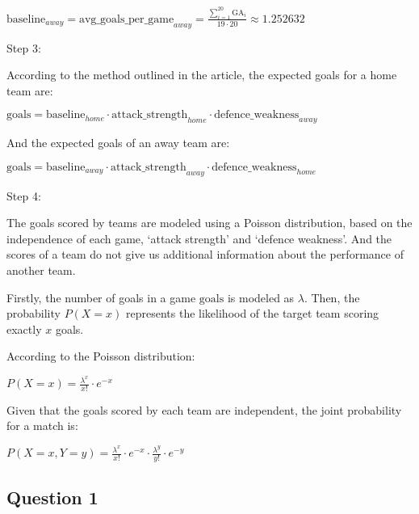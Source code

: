 \documentclass[
]{article}
\begin{document}
\(\text{baseline}_{away}=\text{avg\_goals\_per\_game}_{away}=\frac{\sum_{i=1}^{20}\text{GA}_i}{19\cdot20}\approx1.252632\)

Step 3:

According to the method outlined in the article, the expected goals for
a home team are:

\(\text{goals}=\text{baseline}_{home}\cdot\text{attack\_strength}_{home}\cdot\text{defence\_weakness}_{away}\)

And the expected goals of an away team are:

\(\text{goals}=\text{baseline}_{away}\cdot\text{attack\_strength}_{away}\cdot\text{defence\_weakness}_{home}\)

Step 4:

The goals scored by teams are modeled using a Poisson distribution,
based on the independence of each game, `attack strength' and `defence
weakness'. And the scores of a team do not give us additional
information about the performance of another team.

Firstly, the number of goals in a game \(\text{goals}\) is modeled as
\(\lambda\). Then, the probability \(P(X = x)\) represents the
likelihood of the target team scoring exactly \(x\) goals.

According to the Poisson distribution:

\(P(X=x)=\frac{\lambda^x}{x!}\cdot e^{-x}\)

Given that the goals scored by each team are independent, the joint
probability for a match is:

\(P(X=x,Y=y)=\frac{\lambda^x}{x!}\cdot e^{-x}\cdot\frac{\lambda^y}{y!}\cdot e^{-y}\)

\hypertarget{question-1-2}{%
\subsection{Question 1}\label{question-1-2}}
\end{document}
